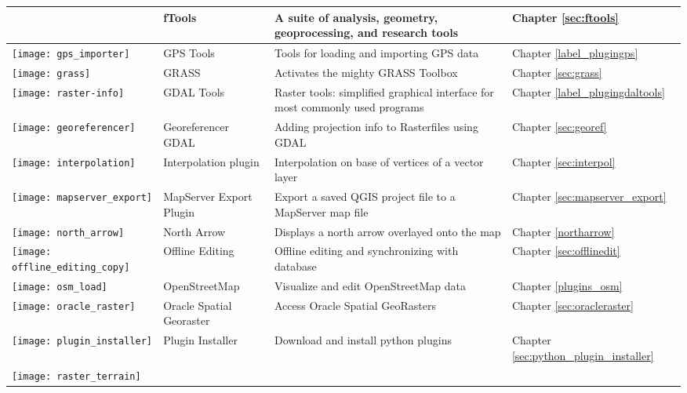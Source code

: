 {\begin{longtable}{|p{1.2cm}|p{3.8cm}|p{7.5cm}|p{3cm}|}
 & fTools \index{plugins!ftools}& A suite of analysis, geometry, geoprocessing, and research tools & Chapter \ref{sec:ftools}\\
\hline
\texttt{[image: gps\_importer]}
 & GPS Tools \index{plugins!gps}& Tools for loading and importing GPS data & Chapter \ref{label_plugingps}\\
\hline
\texttt{[image: grass]}
 & GRASS \index{plugin!grass toolbox} & Activates the mighty GRASS Toolbox & Chapter \ref{sec:grass}\\
\hline
\texttt{[image: raster-info]}
 & GDAL Tools \index{plugins!gdaltools} & Raster tools: simplified graphical interface for most commonly used programs & Chapter \ref{label_plugingdaltools}\\
\hline
\texttt{[image: georeferencer]}
 & Georeferencer GDAL \index{plugin!georeferencer} & Adding projection info to Rasterfiles using GDAL & Chapter \ref{sec:georef}\\
\hline
\texttt{[image: interpolation]}
& Interpolation plugin \index{plugins!Interpolation}& Interpolation on base of vertices of a vector layer & Chapter \ref{sec:interpol}\\
\hline
\texttt{[image: mapserver\_export]}
& MapServer Export Plugin \index{plugins!MapServer Export}& Export a saved QGIS project file to a MapServer map file & Chapter \ref{sec:mapserver_export} \\
\hline
\texttt{[image: north\_arrow]}
& North Arrow \index{plugins!north arrow}& Displays a north arrow overlayed onto the map & Chapter \ref{northarrow}\\
\hline
\texttt{[image: offline\_editing\_copy]}
 & Offline Editing & Offline editing and synchronizing with database & Chapter \ref{sec:offlinedit}\\
\hline
\texttt{[image: osm\_load]}
 & OpenStreetMap & Visualize and edit OpenStreetMap data & Chapter \ref{plugins_osm}\\
\hline
\texttt{[image: oracle\_raster]}
 & Oracle Spatial Georaster \index{plugins!georaster}& Access Oracle Spatial GeoRasters & Chapter 
\ref{sec:oracleraster}\\
\hline
\texttt{[image: plugin\_installer]}
 & Plugin Installer \index{plugins!Plugin Installer} & Download and install python plugins & Chapter \ref{sec:python_plugin_installer}\\
\hline
\texttt{[image: raster\_terrain]}

\end{longtable}}
